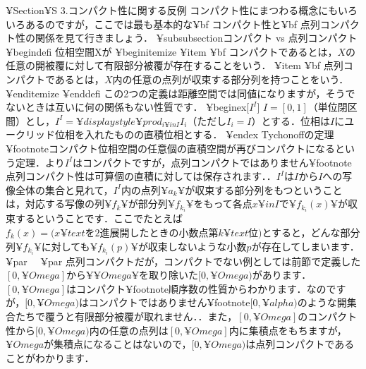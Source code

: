 ¥Section{¥S 3.コンパクト性に関する反例}
コンパクト性にまつわる概念にもいろいろあるのですが，ここでは最も基本的な{¥bf コンパクト性}と{¥bf 点列コンパクト性}の関係を見て行きましょう．
¥subsubsection{コンパクト vs 点列コンパクト}
¥begin{defi}
位相空間Xが
¥begin{itemize}
¥item {¥bf コンパクト}であるとは，$X$の任意の開被覆に対して有限部分被覆が存在することをいう．
¥item {¥bf 点列コンパクト}であるとは，$X$内の任意の点列が収束する部分列を持つことをいう．
¥end{itemize}
¥end{defi}
この2つの定義は距離空間では同値になりますが，そうでないときは互いに何の関係もない性質です．
¥begin{ex}[$I^I$]
$I=[0,1]$（単位閉区間）とし，$I^I=¥displaystyle ¥prod_{i¥in I}I_i$（ただし$I_i=I$）とする．位相は$I$にユークリッド位相を入れたものの直積位相とする．
¥end{ex}
Tychonoffの定理¥footnote{コンパクト位相空間の任意個の直積空間が再びコンパクトになるという定理．}より$I^I$はコンパクトですが，点列コンパクトではありません¥footnote{点列コンパクト性は可算個の直積に対しては保存されます．}．$I^I$は$I$から$I$への写像全体の集合と見れて，$I^I$内の点列$¥{a_k¥}$が収束する部分列をもつということは，対応する写像の列$¥{f_k¥}$が部分列$¥{f_{k_i}¥}$をもって各点$x¥in I$で$¥{ f_{k_i}(x) ¥}$が収束するということです．ここでたとえば$f_k(x)=(x¥text{を2進展開したときの小数点第}k¥text{位)}$とすると，どんな部分列$¥{f_{k_i}¥}$に対しても$¥{f_{k_i}(p)¥}$が収束しないような小数$p$が存在してしまいます．¥par 
　¥par
点列コンパクトだが，コンパクトでない例としては前節で定義した$[0,¥Omega]$から$¥{¥Omega¥}$を取り除いた$[0,¥Omega)$があります．$[0,¥Omega]$はコンパクト¥footnote{順序数の性質からわかります．}なのですが，$[0,¥Omega)$はコンパクトではありません¥footnote{$[0,¥alpha)$のような開集合たちで覆うと有限部分被覆が取れません．}．また，$[0,¥Omega]$のコンパクト性から$[0,¥Omega)$内の任意の点列は$[0,¥Omega]$内に集積点をもちますが，$¥Omega$が集積点になることはないので，$[0,¥Omega)$は点列コンパクトであることがわかります．

